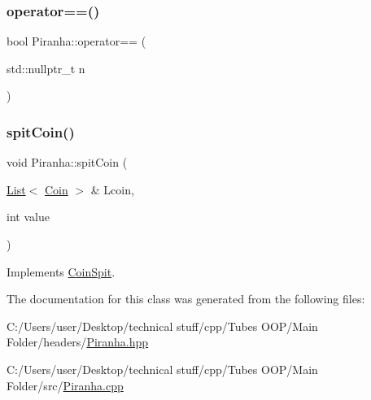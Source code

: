 \mbox{\label{class_piranha_a848b090631fa9bf1219ee1c925246125}} 
\subsubsection{\texorpdfstring{operator==()}{operator==()}\hspace{0.1cm}{\footnotesize\ttfamily [2/2]}}
{\footnotesize\ttfamily bool Piranha\+::operator== (\begin{DoxyParamCaption}\item[{std\+::nullptr\+\_\+t}]{n }\end{DoxyParamCaption})}

\mbox{\label{class_piranha_a4c1c29b2e68b4cb6eb2a295af74bf291}} 
\subsubsection{\texorpdfstring{spit\+Coin()}{spitCoin()}}
{\footnotesize\ttfamily void Piranha\+::spit\+Coin (\begin{DoxyParamCaption}\item[{\mbox{\hyperlink{class_list}{List}}$<$ \mbox{\hyperlink{class_coin}{Coin}} $>$ \&}]{Lcoin,  }\item[{int}]{value }\end{DoxyParamCaption})\hspace{0.3cm}{\ttfamily [virtual]}}



Implements \mbox{\hyperlink{class_coin_spit_a336f45a90c4b0b57017b45a5c68f12a7}{Coin\+Spit}}.



The documentation for this class was generated from the following files\+:\begin{DoxyCompactItemize}
\item 
C\+:/\+Users/user/\+Desktop/technical stuff/cpp/\+Tubes O\+O\+P/\+Main Folder/headers/\mbox{\hyperlink{_piranha_8hpp}{Piranha.\+hpp}}\item 
C\+:/\+Users/user/\+Desktop/technical stuff/cpp/\+Tubes O\+O\+P/\+Main Folder/src/\mbox{\hyperlink{_piranha_8cpp}{Piranha.\+cpp}}\end{DoxyCompactItemize}
